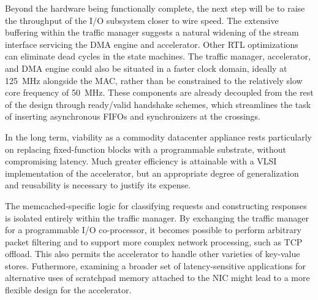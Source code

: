Beyond the hardware being functionally complete, the next step will be
to raise the throughput of the I/O subsystem closer to wire speed.
The extensive buffering within the traffic manager suggests a natural
widening of the stream interface servicing the DMA engine and
accelerator.
Other RTL optimizations can eliminate dead cycles in the state machines.
The traffic manager, accelerator, and DMA engine could also be situated
in a faster clock domain, ideally at \SI{125}{\mega\hertz} alongside the
MAC, rather than be constrained to the relatively slow core
frequency of \SI{50}{\mega\hertz}.
These components are already decoupled from the rest of the design
through ready/valid handshake schemes, which streamlines the task of
inserting asynchronous FIFOs and synchronizers at the crossings.

In the long term, viability as a commodity datacenter appliance rests
particularly on replacing fixed-function blocks with a programmable
substrate, without compromising latency.
Much greater efficiency is attainable with a VLSI implementation of the
accelerator, but an appropriate degree of generalization and reusability
is necessary to justify its expense.

The memcached-specific logic for classifying requests and constructing
responses is isolated entirely within the traffic manager.
By exchanging the traffic manager for a programmable I/O co-processor,
it becomes possible to perform arbitrary packet filtering and to
support more complex network processing, such as TCP offload.
This also permits the accelerator to handle other varieties of key-value
stores. Futhermore, examining a broader set of latency-sensitive applications
for alternative uses of scratchpad memory attached to the NIC might lead
to a more flexible design for the accelerator.
